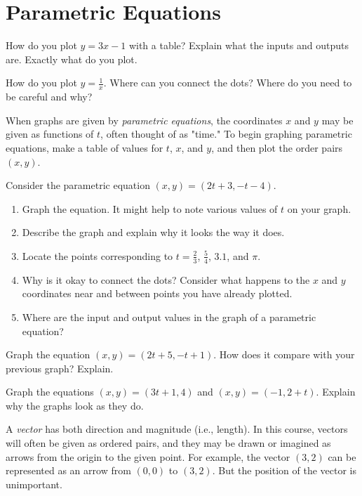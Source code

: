 
\newpage

\section{Parametric Equations}

\begin{prob} How do you plot $y=3x-1$ with a table?  Explain what the inputs and outputs are.  Exactly what do you plot.  
\end{prob}

\begin{prob} How do you plot $y = \frac{1}{x}$.  Where can you connect the dots?  Where do you need to be careful and why?  
\end{prob}

When graphs are given by \emph{parametric equations}, the coordinates $x$ and $y$ may be given as functions of $t$, often thought of as "time."  To begin graphing parametric equations, make a table of values for $t$, $x$, and $y$, and then plot the order pairs $(x, y)$.  

\begin{prob}
 Consider the parametric equation $(x,y) = (2t+3,-t-4)$.  
\begin{enumerate}
\item Graph the equation.  It might help to note various values of $t$ on your graph. 
\item Describe the graph and explain why it looks the way it does.  
\item Locate the points corresponding to $t=\frac{2}{3}$, $\frac{5}{4}$, $3.1$, and $\pi$.  
\item Why is it okay to connect the dots?  Consider what happens to the $x$ and $y$ coordinates near and between points you have already plotted.  
\item Where are the input and output values in the graph of a parametric equation?  
\end{enumerate}

\end{prob}
\begin{prob} Graph the equation $(x,y) = (2t+5,-t+1)$. How does it compare with your previous graph?  Explain. 
\end{prob}
\begin{prob} Graph the equations $(x,y) = (3t+1, 4)$ and $(x,y) = (-1, 2+t)$.  Explain why the graphs look as they do.  
\end{prob}

A \emph{vector} has both direction and magnitude (i.e., length).  In this course, vectors will often be given as ordered pairs, and they may be drawn or imagined as arrows from the origin to the given point.  For example, the vector $(3,2)$ can be represented as an arrow from $(0,0)$ to $(3,2)$.  But the position of the vector is unimportant.  

